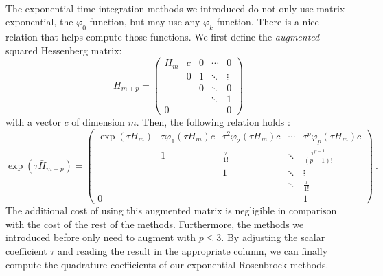       \paragraph{}
      The exponential time integration methods we introduced do not only use matrix exponential, the $\varphi_0$ function, but may use any $\varphi_k$ function.
      There is a nice relation that helps compute those functions.
      We first define the \emph{augmented} squared Hessenberg matrix:
      \begin{equation}
        \bar{H}_{m + p} = \begin{pmatrix}
          H_m & c & 0 & \cdots & 0      \\
              & 0 & 1 & \ddots & \vdots \\
              &   & 0 & \ddots & 0      \\
              &   &   & \ddots & 1      \\
          0   &   &   &        & 0
        \end{pmatrix}
      \end{equation}
      with a vector $c$ of dimension $m$.
      Then, the following relation holds \cite{Sidje1998}:
      \begingroup
      \renewcommand*{\arraystretch}{1.5}
      \begin{equation}
        \exp\left(\tau \bar{H}_{m + p}\right) = \begin{pmatrix}
          \exp\left(\tau H_m\right) & \tau \varphi_1\left(\tau H_m\right) c & \tau^2 \varphi_2\left(\tau H_m\right) c & \cdots & \tau^p \varphi_p\left(\tau H_m\right) c \\
                                    & 1                                     & \frac{\tau}{1!}                         & \ddots & \frac{\tau^{p-1}}{\left(p - 1\right)!}  \\
                                    &                                       & 1                                       & \ddots & \vdots                                  \\
                                    &                                       &                                         & \ddots & \frac{\tau}{1!}                         \\
          0                         &                                       &                                         &        & 1
        \end{pmatrix} \ .
      \end{equation}
      \endgroup
      The additional cost of using this augmented matrix is negligible in comparison with the cost of the rest of the methods.
      Furthermore, the methods we introduced before only need to augment with $p \leq 3$.
      By adjusting the scalar coefficient $\tau$ and reading the result in the appropriate column, we can finally compute the quadrature coefficients of our exponential Rosenbrock methods.


